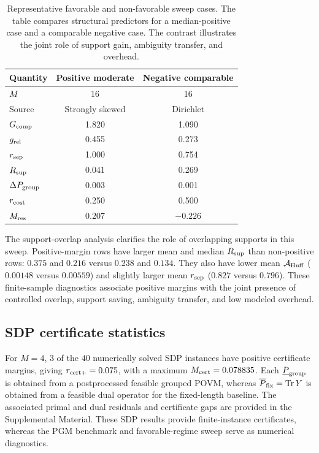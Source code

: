 \documentclass[
 reprint,
 amsmath,amssymb,
 aps,
 pra,
 floatfix,
]{revtex4-2}
\begin{document}
\begin{table}[tbp]
\caption{\label{tab:favorable-pos-neg}Representative favorable and non-favorable sweep cases. The table compares structural predictors for a median-positive case and a comparable negative case. The contrast illustrates the joint role of support gain, ambiguity transfer, and overhead.}
\scriptsize
\setlength{\tabcolsep}{4pt}
\begin{ruledtabular}
\begin{tabular}{lcc}
\textbf{Quantity} & \textbf{Positive moderate} & \textbf{Negative comparable}\\
\hline
$M$ & 16 & 16\\
Source & Strongly skewed & Dirichlet\\
$G_{\rm comp}$ & 1.820 & 1.090\\
$g_{\rm rel}$ & 0.455 & 0.273\\
$r_{\rm sep}$ & 1.000 & 0.754\\
$R_{\rm sup}$ & 0.041 & 0.269\\
$\Delta P_{\rm group}$ & 0.003 & 0.001\\
$r_{\rm cost}$ & 0.250 & 0.500\\
$M_{\rm res}$ & 0.207 & $-0.226$\\
\end{tabular}
\end{ruledtabular}
\end{table}
\FloatBarrier

The support-overlap analysis clarifies the role of overlapping supports in this sweep. Positive-margin rows have larger mean and median \(R_{\rm sup}\) than non-positive rows: \(0.375\) and \(0.216\) versus \(0.238\) and \(0.134\). They also have lower mean \(\mathcal A_{\rm Huff}\) (\(0.00148\) versus \(0.00559\)) and slightly larger mean \(r_{\rm sep}\) (\(0.827\) versus \(0.796\)). These finite-sample diagnostics associate positive margins with the joint presence of controlled overlap, support saving, ambiguity transfer, and low modeled overhead.

\subsection{SDP certificate statistics}

For \(M=4\), \(3\) of the \(40\) numerically solved SDP instances have positive certificate margins, giving \(r_{\rm cert+}=0.075\), with a maximum \(M_{\rm cert}=0.078835\). Each \(\underline P_{\rm group}\) is obtained from a postprocessed feasible grouped POVM, whereas \(\overline P_{\rm fix}=\operatorname{Tr}Y\) is obtained from a feasible dual operator for the fixed-length baseline. The associated primal and dual residuals and certificate gaps are provided in the Supplemental Material. These SDP results provide finite-instance certificates, whereas the PGM benchmark and favorable-regime sweep serve as numerical diagnostics.
\end{document}
